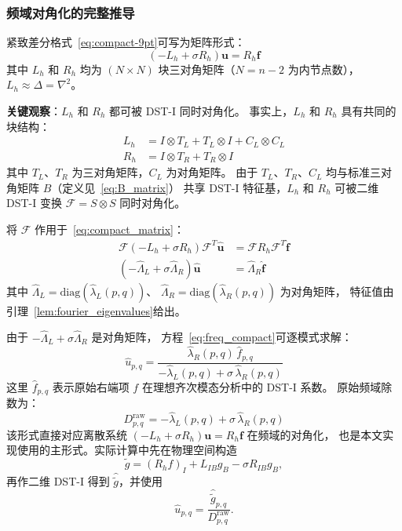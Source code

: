 \subsubsection{频域对角化的完整推导}

紧致差分格式~\eqref{eq:compact-9pt}可写为矩阵形式：
\begin{equation}
  (-L_h + \sigma R_h)\mathbf{u} = R_h \mathbf{f}
  \label{eq:compact_matrix}
\end{equation}
其中 $L_h$ 和 $R_h$ 均为 $(N \times N)$ 块三对角矩阵（$N = n-2$ 为内节点数），
$L_h \approx \Delta = \nabla^2$。

\textbf{关键观察}：$L_h$ 和 $R_h$ 都可被 DST-I 同时对角化。
事实上，$L_h$ 和 $R_h$ 具有共同的块结构：
\begin{align}
  L_h &= I \otimes T_L + T_L \otimes I + C_L \otimes C_L \\
  R_h &= I \otimes T_R + T_R \otimes I
\end{align}
其中 $T_L$、$T_R$ 为三对角矩阵，$C_L$ 为对角矩阵。
由于 $T_L$、$T_R$、$C_L$ 均与标准三对角矩阵 $B$（定义见~\eqref{eq:B_matrix}）
共享 DST-I 特征基，$L_h$ 和 $R_h$ 可被二维 DST-I 变换 $\mathcal{F} = S \otimes S$ 同时对角化。

将 $\mathcal{F}$ 作用于~\eqref{eq:compact_matrix}：
\begin{align}
  \mathcal{F}(-L_h + \sigma R_h)\mathcal{F}^T \hat{\mathbf{u}} &= \mathcal{F} R_h \mathcal{F}^T \hat{\mathbf{f}} \\
  (-\hat{\Lambda}_L + \sigma \hat{\Lambda}_R)\hat{\mathbf{u}} &= \hat{\Lambda}_R \hat{\mathbf{f}}
  \label{eq:freq_compact}
\end{align}
其中 $\hat{\Lambda}_L = \mathrm{diag}(\hat{\lambda}_L(p,q))$、
$\hat{\Lambda}_R = \mathrm{diag}(\hat{\lambda}_R(p,q))$ 为对角矩阵，
特征值由引理~\ref{lem:fourier_eigenvalues}给出。

由于 $-\hat{\Lambda}_L + \sigma\hat{\Lambda}_R$ 是对角矩阵，
方程~\eqref{eq:freq_compact}可逐模式求解：
\begin{equation}
  \hat{u}_{p,q} = \frac{\hat{\lambda}_R(p,q)\,\hat{f}_{p,q}}{-\hat{\lambda}_L(p,q) + \sigma\,\hat{\lambda}_R(p,q)}
  \label{eq:fft9_freq}
\end{equation}
这里 $\hat{f}_{p,q}$ 表示原始右端项 $f$ 在理想齐次模态分析中的 DST-I 系数。
原始频域除数为：
\begin{equation}
  D_{p,q}^{\mathrm{raw}} = -\hat{\lambda}_L(p,q) + \sigma\,\hat{\lambda}_R(p,q)
  \label{eq:fft9_divisor}
\end{equation}
该形式直接对应离散系统 $(-L_h+\sigma R_h)\mathbf{u}=R_h\mathbf{f}$ 在频域的对角化，
也是本文实现使用的主形式。实际计算中先在物理空间构造
\[
\tilde{g}=(R_h f)_I+L_{IB}g_B-\sigma R_{IB}g_B,
\]
再作二维 DST-I 得到 $\hat{\tilde{g}}$，并使用
\[
\hat{u}_{p,q} = \frac{\hat{\tilde{g}}_{p,q}}{D_{p,q}^{\mathrm{raw}}}.
\]

